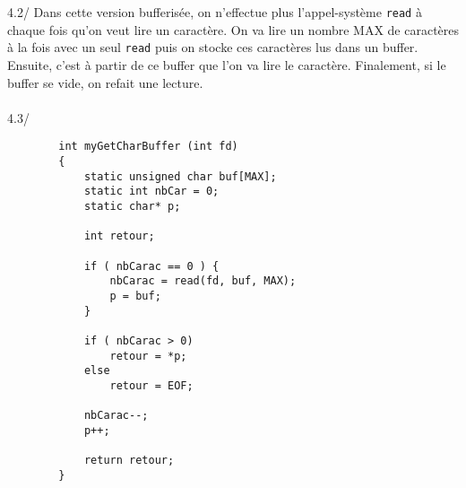 \documentclass[a4paper,11pt]{article}
\begin{document}
	\\~\\
	4.2/ Dans cette version bufferisée, on n'effectue plus l'appel-système \lstinline!read! à chaque fois qu'on veut lire un caractère. On va lire un nombre MAX de caractères à la fois avec un seul \lstinline!read! puis on stocke ces caractères lus dans un buffer. Ensuite, c'est à partir de ce buffer que l'on va lire le caractère. Finalement, si le buffer se vide, on refait une lecture.  
	\\~\\
	4.3/
	\begin{lstlisting}
		int myGetCharBuffer (int fd) 
		{
			static unsigned char buf[MAX];
			static int nbCar = 0;
			static char* p;
			
			int retour; 
			
			if ( nbCarac == 0 ) {
				nbCarac = read(fd, buf, MAX);
				p = buf;
			}
			
			if ( nbCarac > 0)
				retour = *p;
			else 
				retour = EOF;
				
			nbCarac--;
			p++;
				
			return retour;
		}
	\end{lstlisting}
	
	
\end{document}
